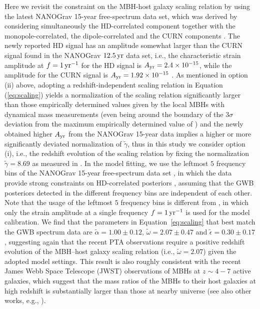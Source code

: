 \documentclass[twocolumn]{aastex631}
\newcommand{\talpha}{{\tilde{\alpha}}}
\newcommand{\tgamma}{{\tilde{\gamma}}}
\newcommand{\tomega}{{\tilde{\omega}}}
\newcommand{\tepsilon}{{\tilde{\epsilon}}}
\newcommand{\yr}{{\rm\,yr}}
\begin{document}
%
Here we revisit the constraint on the MBH-host galaxy scaling relation by using
the latest NANOGrav 15-year free-spectrum data set, which was derived by
considering simultaneously the HD-correlated component together with the
monopole-correlated, the dipole-correlated and the CURN components \citep[][see
the HD-w/MP+DP+CURN model therein]{NG23hd, NG23constraint}. 
%
The newly reported HD signal has an amplitude somewhat larger than the CURN
signal found in the NANOGrav $12.5\yr$ data set, i.e., the characteristic strain
amplitude at $f=1\,{\rm yr}^{-1}$ for the HD signal is $A_{\rm yr}=2.4\times
10^{-15}$, while the amplitude for the CURN signal is $A_{\rm yr}=1.92\times
10^{-15}$ \citep{NG20cps}.
As mentioned in option (ii) above, adopting a redshift-independent scaling
relation in Equation (\ref{eq:scaling}) yields a normalization of the scaling
relation significantly larger than those empirically determined values given by
the local MBHs with dynamical mass measurements (even being around the boundary
of the $3\sigma$ deviation from the maximum empirically determined value of
\citealt{KH13}) and the newly obtained higher $A_{\rm yr}$ from
the NANOGrav 15-year data implies a higher or more significantly deviated
normalization of $\tgamma$,
thus in this study we consider option (i), i.e., the redshift
evolution of the scaling relation by fixing the normalization $\tgamma=8.69$ as measured in
\citet{KH13}.
%
In the model fitting, we use the leftmost $5$ frequency bins of the
NANOGrav 15-year free-spectrum data set \citep{NG23hd}, in which the
data provide strong constraints on HD-correlated posteriors \citep{NG23constraint},
assuming that the GWB posteriors detected in the different frequency bins are
independent of each other. Note that the usage of the leftmost $5$ frequency
bins is different from \citet{CYL23cgws}, in which only the strain amplitude
at a single frequency $f=1\,{\rm yr}^{-1}$ is used for the model calibration.
%
We find that the parameters in Equation~\eqref{eq:scaling} that best match the
GWB spectrum data are $\talpha=1.00\pm 0.12$, $\tomega=2.07\pm 0.47$ and
$\tepsilon=0.30\pm 0.17$, suggesting again that the recent PTA observations
require a positive redshift evolution of the MBH--host galaxy scaling relation
(i.e., $\tomega=2.07$) given the adopted model settings.
%
This result is also roughly consistent with the recent James Webb Space Telescope (JWST) observations of MBHs at
$z\sim 4-7$ active galaxies, which suggest that the mass ratios of the MBHs to their host
galaxies at high redshift is substantially larger than those at nearby universe \citep{Pacucci23} (see also other 
works, e.g., \citealt{McLure06, Merloni10, ZLY12}).
\end{document}
